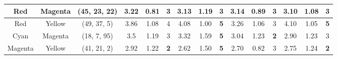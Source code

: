 \begin{table}[htbp]
{\begin{tabular}{@{}ccclcccccccccccc@{}}
    Red                     & \multicolumn{1}{c|}{Magenta}                   & \multicolumn{2}{c|}{\cellcolor[HTML]{FF0080}(45, 23, 22)}  & \multicolumn{1}{c|}{3.22} & \multicolumn{1}{c|}{0.81}  & \multicolumn{1}{c|}{3}                                  & \multicolumn{1}{c|}{3.13} & \multicolumn{1}{c|}{1.19}  & \multicolumn{1}{c||}{3}                                  & \multicolumn{1}{c|}{3.14}                   & \multicolumn{1}{c|}{0.89}                   & \multicolumn{1}{c|}{3}                                  & \multicolumn{1}{c|}{3.10}                   & \multicolumn{1}{c|}{1.08}                   & \multicolumn{1}{c|}{3}                                                    \\ \midrule
    Red                     & \multicolumn{1}{c|}{Yellow}                    & \multicolumn{2}{c|}{\cellcolor[HTML]{FF8000}(49, 37, 5)}   & \multicolumn{1}{c|}{3.86} & \multicolumn{1}{c|}{1.08}  & \multicolumn{1}{c|}{4}                                  & \multicolumn{1}{c|}{4.08} & \multicolumn{1}{c|}{1.00}  & \multicolumn{1}{c||}{\cellcolor[HTML]{32CB00}\textbf{5}} & \multicolumn{1}{c|}{3.26}                   & \multicolumn{1}{c|}{1.06}                   & \multicolumn{1}{c|}{3}                                  & \multicolumn{1}{c|}{4.10}                   & \multicolumn{1}{c|}{1.05}                   & \multicolumn{1}{c|}{\cellcolor[HTML]{32CB00}\textbf{5}}                   \\ \midrule
    Cyan                    & \multicolumn{1}{c|}{Magenta}                   & \multicolumn{2}{c|}{\cellcolor[HTML]{0000FF}(18, 7, 95)}   & \multicolumn{1}{c|}{3.5}  & \multicolumn{1}{c|}{1.19}  & \multicolumn{1}{c|}{3}                                  & \multicolumn{1}{c|}{3.32} & \multicolumn{1}{c|}{1.59}  & \multicolumn{1}{c||}{\cellcolor[HTML]{32CB00}\textbf{5}} & \multicolumn{1}{c|}{3.04}                   & \multicolumn{1}{c|}{1.23}                   & \multicolumn{1}{c|}{\cellcolor[HTML]{FD6864}\textbf{2}} & \multicolumn{1}{c|}{2.90}                   & \multicolumn{1}{c|}{1.23}                   & \multicolumn{1}{c|}{3}                                                    \\ \midrule
    Magenta                 & \multicolumn{1}{c|}{Yellow}                    & \multicolumn{2}{c|}{\cellcolor[HTML]{FF0000}(41, 21, 2)}   & \multicolumn{1}{c|}{2.92} & \multicolumn{1}{c|}{1.22}  & \multicolumn{1}{c|}{\cellcolor[HTML]{FD6864}\textbf{2}} & \multicolumn{1}{c|}{2.62} & \multicolumn{1}{c|}{1.50}  & \multicolumn{1}{c||}{\cellcolor[HTML]{32CB00}\textbf{5}} & \multicolumn{1}{c|}{2.70}                   & \multicolumn{1}{c|}{0.82}                   & \multicolumn{1}{c|}{3}                                  & \multicolumn{1}{c|}{2.75}                   & \multicolumn{1}{c|}{1.24}                   & \multicolumn{1}{c|}{\cellcolor[HTML]{FD6864}\textbf{2}}                   \\ \midrule

\end{tabular}}
\end{table}
